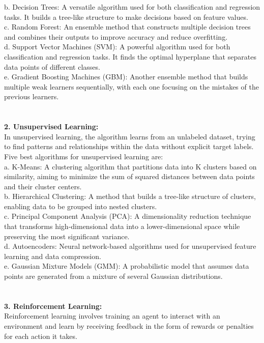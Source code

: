\documentclass[a4paper,12pt]{article}
\begin{document}
b. Decision Trees: A versatile algorithm used for both classification and regression tasks. It builds a tree-like structure to make decisions based on feature values.\\


c. Random Forest: An ensemble method that constructs multiple decision trees and combines their outputs to improve accuracy and reduce overfitting.\\

d. Support Vector Machines (SVM): A powerful algorithm used for both classification and regression tasks. It finds the optimal hyperplane that separates data points of different classes.\\


e. Gradient Boosting Machines (GBM): Another ensemble method that builds multiple weak learners sequentially, with each one focusing on the mistakes of the previous learners.\\
\\
\\
\textbf{2. Unsupervised Learning:}\\
In unsupervised learning, the algorithm learns from an unlabeled dataset, trying to find patterns and relationships within the data without explicit target labels.\\

Five best algorithms for unsupervised learning are:\\

a. K-Means: A clustering algorithm that partitions data into K clusters based on similarity, aiming to minimize the sum of squared distances between data points and their cluster centers.
\\

b. Hierarchical Clustering: A method that builds a tree-like structure of clusters, enabling data to be grouped into nested clusters.
\\

c. Principal Component Analysis (PCA): A dimensionality reduction technique that transforms high-dimensional data into a lower-dimensional space while preserving the most significant variance.
\\

d. Autoencoders: Neural network-based algorithms used for unsupervised feature learning and data compression.
\\

e. Gaussian Mixture Models (GMM): A probabilistic model that assumes data points are generated from a mixture of several Gaussian distributions.
\\
\\
\\
\textbf{3. Reinforcement Learning:}\\
Reinforcement learning involves training an agent to interact with an environment and learn by receiving feedback in the form of rewards or penalties for each action it takes.\\
\end{document}
